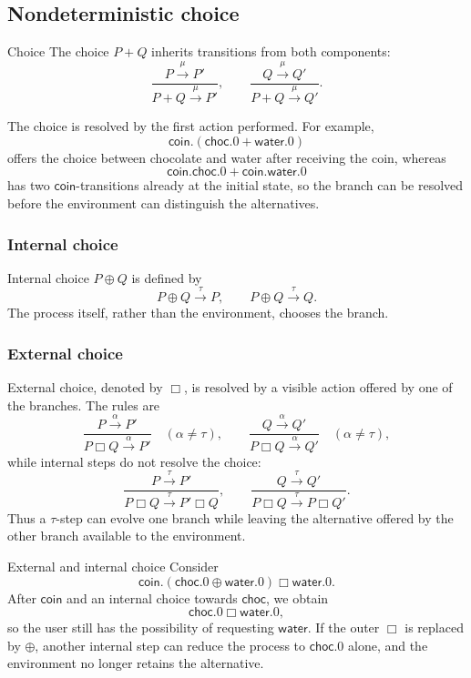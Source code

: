 \documentclass[a4paper]{article}
\newcommand{\trans}[1]{\xrightarrow{#1}}
\begin{document}
\subsection{Nondeterministic choice}

\begin{snippetdefinition}{Choice}
    The choice \(P+Q\) inherits transitions from both components:
    \[
        \frac{P\trans{\mu}P'}{P+Q\trans{\mu}P'},
        \qquad
        \frac{Q\trans{\mu}Q'}{P+Q\trans{\mu}Q'}.
    \]
\end{snippetdefinition}

The choice is resolved by the first action performed.
For example,
\[
    \mathsf{coin}.(\mathsf{choc}.0+\mathsf{water}.0)
\]
offers the choice between chocolate and water after receiving the coin, whereas
\[
    \mathsf{coin}.\mathsf{choc}.0
    +
    \mathsf{coin}.\mathsf{water}.0
\]
has two \(\mathsf{coin}\)-transitions already at the initial state, so the branch can be resolved before the environment can distinguish the alternatives.

\subsubsection{Internal choice}

Internal choice \(P\oplus Q\) is defined by
\[
    P\oplus Q\trans{\tau}P,
    \qquad
    P\oplus Q\trans{\tau}Q.
\]
The process itself, rather than the environment, chooses the branch.

\subsubsection{External choice}

External choice, denoted by \(\Box\), is resolved by a visible action offered by one of the branches.
The rules are
\[
    \frac{P\trans{\alpha}P'}{P\Box Q\trans{\alpha}P'}
    \quad(\alpha\neq\tau),
    \qquad
    \frac{Q\trans{\alpha}Q'}{P\Box Q\trans{\alpha}Q'}
    \quad(\alpha\neq\tau),
\]
while internal steps do not resolve the choice:
\[
    \frac{P\trans{\tau}P'}{P\Box Q\trans{\tau}P'\Box Q},
    \qquad
    \frac{Q\trans{\tau}Q'}{P\Box Q\trans{\tau}P\Box Q'}.
\]
Thus a \(\tau\)-step can evolve one branch while leaving the alternative offered by the other branch available to the environment.

\begin{snippetexample}{External and internal choice}
    Consider
    \[
        \mathsf{coin}.(\mathsf{choc}.0\oplus\mathsf{water}.0)
        \Box
        \mathsf{water}.0.
    \]
    After \(\mathsf{coin}\) and an internal choice towards \(\mathsf{choc}\), we obtain
    \[
        \mathsf{choc}.0\Box\mathsf{water}.0,
    \]
    so the user still has the possibility of requesting \(\mathsf{water}\).
    If the outer \(\Box\) is replaced by \(\oplus\), another internal step can reduce the process to \(\mathsf{choc}.0\) alone, and the environment no longer retains the alternative.
\end{snippetexample}
\end{document}
